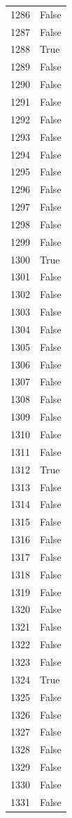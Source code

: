 \documentclass[
  letterpaper,
  DIV=11,
  numbers=noendperiod]{scrreprt}
\begin{document}
\begin{tabular}{ll}
1286 &  False \\
1287 &  False \\
1288 &   True \\
1289 &  False \\
1290 &  False \\
1291 &  False \\
1292 &  False \\
1293 &  False \\
1294 &  False \\
1295 &  False \\
1296 &  False \\
1297 &  False \\
1298 &  False \\
1299 &  False \\
1300 &   True \\
1301 &  False \\
1302 &  False \\
1303 &  False \\
1304 &  False \\
1305 &  False \\
1306 &  False \\
1307 &  False \\
1308 &  False \\
1309 &  False \\
1310 &  False \\
1311 &  False \\
1312 &   True \\
1313 &  False \\
1314 &  False \\
1315 &  False \\
1316 &  False \\
1317 &  False \\
1318 &  False \\
1319 &  False \\
1320 &  False \\
1321 &  False \\
1322 &  False \\
1323 &  False \\
1324 &   True \\
1325 &  False \\
1326 &  False \\
1327 &  False \\
1328 &  False \\
1329 &  False \\
1330 &  False \\
1331 &  False \\

\end{tabular}
\end{document}
